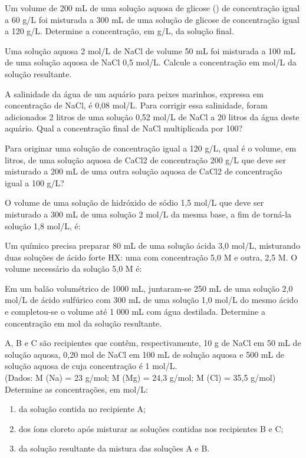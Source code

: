 \documentclass[a4paper,12]{exam}
\begin{document}
\begin{multicols}{2}
\begin{questions}

  \question Um volume de 200 mL de uma solução aquosa de glicose () de concentração igual a 60 g/L foi misturada a 300 mL de uma solução de glicose de concentração igual a 120 g/L. Determine a concentração, em g/L, da solução final.\makeemptybox{2cm}

  \question Uma solução aquosa 2 mol/L de NaCl de volume 50 mL foi misturada a 100 mL de uma solução aquosa de NaCl 0,5 mol/L. Calcule a concentração em mol/L da solução resultante. \makeemptybox{2cm}

  \question A salinidade da água de um aquário para peixes marinhos, expressa em concentração de NaCl, é 0,08 mol/L. Para corrigir essa salinidade, foram adicionados 2 litros de uma solução 0,52 mol/L de NaCl a 20 litros da água deste aquário. Qual a concentração final de NaCl multiplicada por 100?
  \makeemptybox{2cm}

  \question Para originar uma solução de concentração igual a 120 g/L, qual é o volume, em litros, de uma solução aquosa de CaCl2 de concentração 200 g/L que deve ser misturado a 200 mL de uma outra solução aquosa de CaCl2 de concentração igual a 100 g/L? \makeemptybox{2cm}

  \question O volume de uma solução de hidróxido de sódio 1,5 mol/L que deve ser misturado a 300 mL de uma solução 2 mol/L da mesma base, a fim de torná-la solução 1,8 mol/L, é:\makeemptybox{2cm}

  \question Um químico precisa preparar 80 mL de uma solução ácida 3,0 mol/L, misturando duas soluções de ácido forte HX: uma com concentração 5,0 M e outra, 2,5 M. O volume necessário da solução 5,0 M é:\makeemptybox{2cm}

  \question Em um balão volumétrico de 1000 mL, juntaram-se 250 mL de uma solução 2,0 mol/L de ácido sulfúrico com 300 mL de uma solução 1,0 mol/L do mesmo ácido e completou-se o volume até 1 000 mL com água destilada. Determine a concentração em mol da solução resultante. \makeemptybox{2cm}

  \question A, B e C são recipientes que contêm, respectivamente, 10 g de NaCl em 50 mL de solução aquosa, 0,20 mol de NaCl em 100 mL de solução aquosa e 500 mL de solução aquosa de  cuja concentração é 1 mol/L.\\
(Dados: M (Na) = 23 g/mol; M (Mg) = 24,3 g/mol; M (Cl) = 35,5 g/mol)\\
  Determine as concentrações, em mol/L:
  \begin{enumerate}[label=\alph*)]
\item da solução contida no recipiente A; \makeemptybox{2cm}
\item dos íons cloreto após misturar as soluções contidas nos recipientes B e C;\makeemptybox{2cm}
\item da solução resultante da mistura das soluções A e B. \makeemptybox{2cm}
  \end{enumerate}


\end{questions}
\end{multicols}
\end{document}
